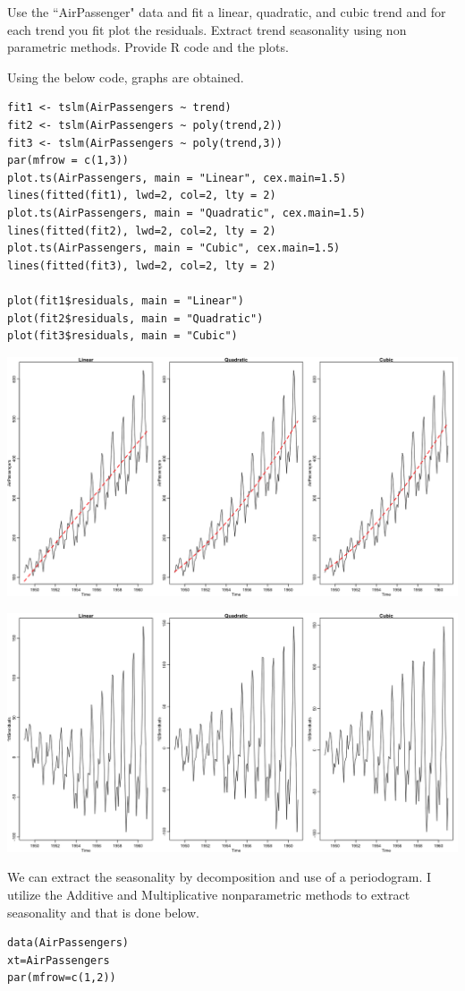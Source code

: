 \documentclass[10pt,a4paper]{exam}
\begin{document}
\begin{questions}
\question Use the ``AirPassenger" data and fit a linear, quadratic, and cubic trend and for each trend you fit plot the residuals. Extract trend seasonality using non parametric methods. Provide R code and the plots.

\begin{solution}
Using the below code, graphs are obtained.
\begin{verbatim}
fit1 <- tslm(AirPassengers ~ trend)
fit2 <- tslm(AirPassengers ~ poly(trend,2))
fit3 <- tslm(AirPassengers ~ poly(trend,3))
par(mfrow = c(1,3))
plot.ts(AirPassengers, main = "Linear", cex.main=1.5)
lines(fitted(fit1), lwd=2, col=2, lty = 2)
plot.ts(AirPassengers, main = "Quadratic", cex.main=1.5)
lines(fitted(fit2), lwd=2, col=2, lty = 2)
plot.ts(AirPassengers, main = "Cubic", cex.main=1.5)
lines(fitted(fit3), lwd=2, col=2, lty = 2)

plot(fit1$residuals, main = "Linear")
plot(fit2$residuals, main = "Quadratic")
plot(fit3$residuals, main = "Cubic")
\end{verbatim}

\begin{center}
\includegraphics[width=.9\linewidth]{AirPassengersFits}
\end{center}


\begin{center}
\includegraphics[width=.9\linewidth]{AirPassengerResiduals}
\end{center}
\end{solution}
\pagebreak
\begin{solution}
We can extract the seasonality by decomposition and use of a periodogram. I utilize the Additive and Multiplicative nonparametric methods to extract seasonality and that is done below.
\begin{verbatim}
data(AirPassengers)
xt=AirPassengers
par(mfrow=c(1,2))


\end{verbatim}
\end{solution}
\end{questions}
\end{document}
